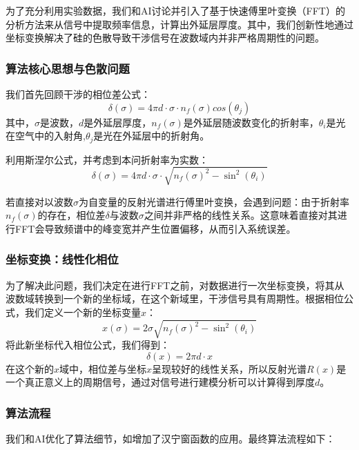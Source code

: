 \documentclass[a4paper]{ctexart}
\begin{document}
为了充分利用实验数据，我们和AI\cite{ai:claude}讨论并引入了基于快速傅里叶变换（FFT）的分析方法来从信号中提取频率信息，计算出外延层厚度。其中，我们创新性地通过坐标变换解决了硅的色散导致干涉信号在波数域内并非严格周期性的问题。


\subsubsection{算法核心思想与色散问题}
我们首先回顾干涉的相位差公式：
\begin{equation}
    \delta(\sigma) = 4\pi d \cdot \sigma \cdot n_f(\sigma)cos(\theta_j)
\end{equation}
其中，$\sigma$是波数，$d$是外延层厚度，$n_f(\sigma)$是外延层随波数变化的折射率，$\theta_i$是光在空气中的入射角,$\theta_j$是光在外延层中的折射角。

利用斯涅尔公式，并考虑到本问折射率为实数：
\begin{equation}
    \delta(\sigma) = 4\pi d \cdot \sigma \cdot \sqrt{n_f(\sigma)^2 - \sin^2(\theta_i)}
\end{equation}

若直接对以波数$\sigma$为自变量的反射光谱进行傅里叶变换，会遇到问题：由于折射率$n_f(\sigma)$的存在，相位差$\delta$与波数$\sigma$之间并非严格的线性关系。这意味着直接对其进行FFT会导致频谱中的峰变宽并产生位置偏移，从而引入系统误差。

\subsubsection{坐标变换：线性化相位}
为了解决此问题，我们决定在进行FFT之前，对数据进行一次坐标变换，将其从波数域转换到一个新的坐标域，在这个新域里，干涉信号具有周期性。根据相位公式，我们定义一个新的坐标变量$x$：
\begin{equation}
    x(\sigma) = 2 \sigma \sqrt{n_f(\sigma)^2 - \sin^2(\theta_i)}
    \label{eq:coord_transform}
\end{equation}
将此新坐标代入相位公式，我们得到：
\begin{equation}
    \delta(x) = 2\pi d \cdot x
\end{equation}
在这个新的$x$域中，相位差与坐标$x$呈现较好的线性关系，所以反射光谱$R(x)$是一个真正意义上的周期信号，通过对信号进行建模分析可以计算得到厚度$d$。

\subsubsection{算法流程}
我们和AI\cite{ai:gemini}优化了算法细节，如增加了汉宁窗函数的应用。最终算法流程如下：
\end{document}
